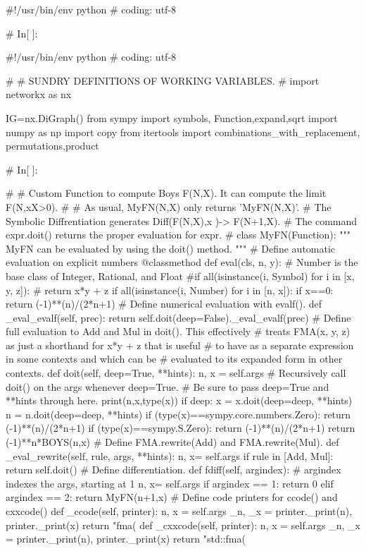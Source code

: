 #!/usr/bin/env python
# coding: utf-8

# In[ ]:


#!/usr/bin/env python
# coding: utf-8

#
#  SUNDRY DEFINITIONS OF WORKING VARIABLES.
#
import networkx as nx

IG=nx.DiGraph() 
from sympy import symbols, Function,expand,sqrt
import numpy as np
import copy
from itertools import combinations_with_replacement, permutations,product


# In[ ]:


#
#  Custom Function to compute Boys F(N,X). It can compute the limit F(N,xX>0).
#
#  As usual, MyFN(N,X) only returns 'MyFN(N,X)'.
#  The Symbolic Diffrentiation generates Diff(F(N,X),x )-> F(N+1,X).
#  The command expr.doit() returns the proper evaluation for expr.
#
class MyFN(Function):
    """
    MyFN can be evaluated by using the doit() method.
    """
    # Define automatic evaluation on explicit numbers
    @classmethod
    def eval(cls, n, y):
        # Number is the base class of Integer, Rational, and Float
        #if all(isinstance(i, Symbol) for i in [x, y, z]):
        #   return x*y + z
        if all(isinstance(i, Number) for i in [n, x]):
            if x==0:
                return (-1)**(n)/(2*n+1)
    # Define numerical evaluation with evalf().
    def _eval_evalf(self, prec):
        return self.doit(deep=False)._eval_evalf(prec)
    # Define full evaluation to Add and Mul in doit(). This effectively
    # treats FMA(x, y, z) as just a shorthand for x*y + z that is useful
    # to have as a separate expression in some contexts and which can be
    # evaluated to its expanded form in other contexts.
    def doit(self, deep=True, **hints):
        n, x = self.args
        # Recursively call doit() on the args whenever deep=True.
        # Be sure to pass deep=True and **hints through here.
        print(n,x,type(x))
        if deep:
            x = x.doit(deep=deep, **hints)
            n = n.doit(deep=deep, **hints)
        if (type(x)==sympy.core.numbers.Zero):   
            return (-1)**(n)/(2*n+1)
        if (type(x)==sympy.S.Zero):   
            return (-1)**(n)/(2*n+1)
        return (-1)**n*BOYS(n,x)
    # Define FMA.rewrite(Add) and FMA.rewrite(Mul).
    def _eval_rewrite(self, rule, args, **hints):
        n, x= self.args
        if rule in [Add, Mul]:
            return self.doit()
    # Define differentiation.
    def fdiff(self, argindex):
        # argindex indexes the args, starting at 1
        n, x= self.args
        if argindex == 1:
            return 0
        elif argindex == 2:
            return MyFN(n+1,x)
    # Define code printers for ccode() and cxxcode()
    def _ccode(self, printer):
        n, x = self.args
        _n, _x = printer._print(n), printer._print(x)
        return "fma(%
    def _cxxcode(self, printer):
        n, x = self.args
        _n, _x = printer._print(n), printer._print(x)
        return "std::fma(%


